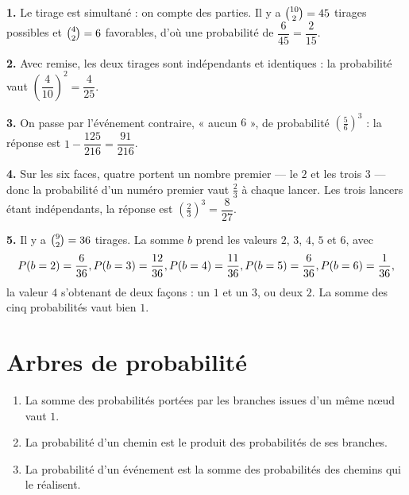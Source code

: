 \begin{corrige}
\textbf{1.} Le tirage est simultané : on compte des parties. Il y a
$\combi{2}{10} = 45$ tirages possibles et $\combi{2}{4} = 6$ favorables, d'où
une probabilité de $\dfrac{6}{45} = \dfrac{2}{15}$.

\textbf{2.} Avec remise, les deux tirages sont indépendants et identiques :
la probabilité vaut $\left(\dfrac{4}{10}\right)^{2} = \dfrac{4}{25}$.

\textbf{3.} On passe par l'événement contraire, « aucun $6$ », de probabilité
$\left(\frac56\right)^{3}$ : la réponse est
$1-\dfrac{125}{216} = \dfrac{91}{216}$.

\textbf{4.} Sur les six faces, quatre portent un nombre premier — le $2$ et
les trois $3$ — donc la probabilité d'un numéro premier vaut $\frac23$ à
chaque lancer. Les trois lancers étant indépendants, la réponse est
$\left(\frac23\right)^{3} = \dfrac{8}{27}$.

\textbf{5.} Il y a $\combi{2}{9} = 36$ tirages. La somme $b$ prend les valeurs
$2$, $3$, $4$, $5$ et $6$, avec
\[
  \proba{b=2} = \frac{6}{36}, \quad
  \proba{b=3} = \frac{12}{36}, \quad
  \proba{b=4} = \frac{11}{36}, \quad
  \proba{b=5} = \frac{6}{36}, \quad
  \proba{b=6} = \frac{1}{36},
\]
la valeur $4$ s'obtenant de deux façons : un $1$ et un $3$, ou deux $2$. La
somme des cinq probabilités vaut bien $1$.
\end{corrige}

\section{Arbres de probabilité}

\begin{propriete}
\begin{enumerate}[label=\textbf{\arabic*.}, leftmargin=*, itemsep=0.15em]
  \item La somme des probabilités portées par les branches issues d'un même
        n\oe ud vaut $1$.
  \item La probabilité d'un chemin est le produit des probabilités de ses
        branches.
  \item La probabilité d'un événement est la somme des probabilités des
        chemins qui le réalisent.
\end{enumerate}
\end{propriete}

